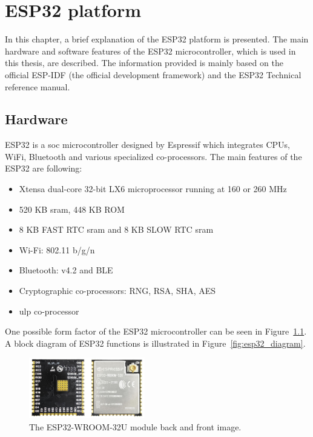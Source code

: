 \chapter{ESP32 platform}\label{sec:esp32}

In this chapter, a brief explanation of the ESP32 platform is presented. The main hardware and software features of the ESP32 microcontroller, which is used in this thesis, are described. The information provided is mainly based on the official ESP-IDF (the official development framework)\cite{espidf2022} and the ESP32 Technical reference manual\cite{esp322021}.

\section{Hardware}

ESP32 is a \gls{soc} microcontroller designed by Espressif which integrates CPUs, WiFi, Bluetooth and various specialized co-processors. The main features of the ESP32 are following:

\begin{itemize}
    \item Xtensa dual-core 32-bit LX6 microprocessor running at 160 or 260 MHz
    \item 520 KB \gls{sram}, 448 KB ROM
    \item 8 KB FAST RTC \gls{sram} and 8 KB SLOW RTC \gls{sram}
    \item Wi-Fi: 802.11 b/g/n
    \item Bluetooth: v4.2 and BLE
    \item Cryptographic co-processors: RNG, RSA, SHA, AES
    \item \Gls{ulp} co-processor
\end{itemize}

One possible form factor of the ESP32 microcontroller can be seen in Figure~\ref{fig:esp32_wroom_module}. A block diagram of ESP32 functions is illustrated in Figure~\ref{fig:esp32_diagram}.

\begin{figure}[hb!]
    \centering
    \captionsetup{justification=centering,margin=0.5cm}
    \includegraphics[width=0.45\textwidth]{images/esp32_wroom_module.jpg}
    \caption[The ESP32-WROOM-32U module back and front image.]{The ESP32-WROOM-32U module back and front image.\cite{SOSelectronic2018}}
    \label{fig:esp32_wroom_module}
\end{figure}

